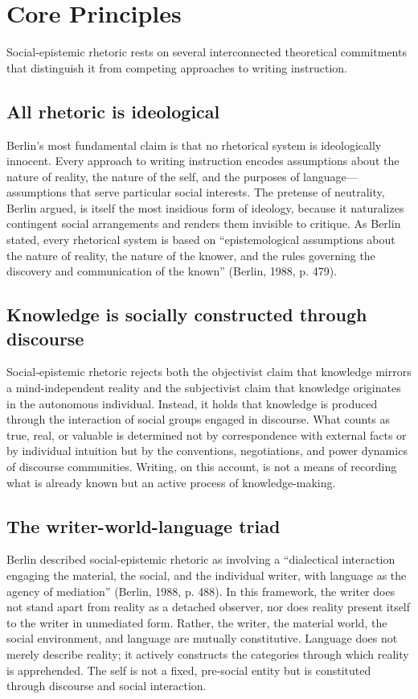 \documentclass[12pt]{article}
\begin{document}
\section{Core Principles}

Social-epistemic rhetoric rests on several interconnected theoretical commitments that distinguish it from competing approaches to writing instruction.

\subsection*{All rhetoric is ideological}

Berlin's most fundamental claim is that no rhetorical system is ideologically innocent. Every approach to writing instruction encodes assumptions about the nature of reality, the nature of the self, and the purposes of language---assumptions that serve particular social interests. The pretense of neutrality, Berlin argued, is itself the most insidious form of ideology, because it naturalizes contingent social arrangements and renders them invisible to critique. As Berlin stated, every rhetorical system is based on ``epistemological assumptions about the nature of reality, the nature of the knower, and the rules governing the discovery and communication of the known'' (Berlin, 1988, p. 479).

\subsection*{Knowledge is socially constructed through discourse}

Social-epistemic rhetoric rejects both the objectivist claim that knowledge mirrors a mind-independent reality and the subjectivist claim that knowledge originates in the autonomous individual. Instead, it holds that knowledge is produced through the interaction of social groups engaged in discourse. What counts as true, real, or valuable is determined not by correspondence with external facts or by individual intuition but by the conventions, negotiations, and power dynamics of discourse communities. Writing, on this account, is not a means of recording what is already known but an active process of knowledge-making.

\subsection*{The writer-world-language triad}

Berlin described social-epistemic rhetoric as involving a ``dialectical interaction engaging the material, the social, and the individual writer, with language as the agency of mediation'' (Berlin, 1988, p. 488). In this framework, the writer does not stand apart from reality as a detached observer, nor does reality present itself to the writer in unmediated form. Rather, the writer, the material world, the social environment, and language are mutually constitutive. Language does not merely describe reality; it actively constructs the categories through which reality is apprehended. The self is not a fixed, pre-social entity but is constituted through discourse and social interaction.
\end{document}
